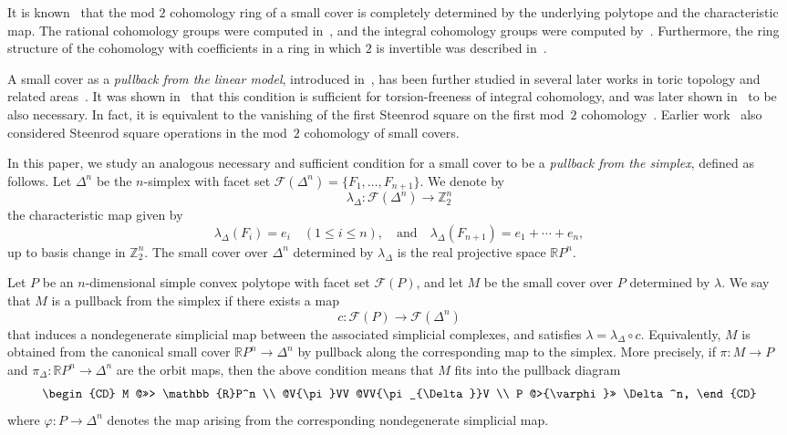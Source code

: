 \documentclass{amsart}
\newcommand{\cF}{\mathcal{F}}
\newcommand{\RP}{\mathbb{R}P}
\newcommand{\Z}{\mathbb{Z}}
\theoremstyle{plain}
\numberwithin{equation}{section}
\theoremstyle{definition}
\theoremstyle{remark}
\begin{document}
It is known~\cite{Davis-Januszkiewicz1991} that the mod $2$ cohomology ring of a small cover is completely determined by the underlying polytope and the characteristic map.
The rational cohomology groups were computed in~\cite{Suciu-Trevisan2012,Choi-Park2017Cohomology}, and the integral cohomology groups were computed by~\cite{Cai-Choi2021}.
Furthermore, the ring structure of the cohomology with coefficients in a ring in which $2$ is invertible was described in~\cite{Choi-Park2020}.

A small cover as a \emph{pullback from the linear model}, introduced in~\cite{Davis-Januszkiewicz1991}, has been further studied in several later works in toric topology and related areas~\cite{Izmestiev2001,Joswig2002,Nakayama-Nishimura2005, Cai-Choi-Park2020}.
It was shown in~\cite{Davis-Januszkiewicz1991} that this condition is sufficient for torsion-freeness of integral cohomology, and was later shown in~\cite{Cai-Choi-Park2020} to be also necessary. 
In fact, it is equivalent to the vanishing of the first Steenrod square on the first mod~$2$ cohomology~\cite{Cai-Choi-Park2020}.
Earlier work~\cite{Bahri-Bendersky2000} also considered Steenrod square operations in the mod~$2$ cohomology of small covers.




In this paper, we study an analogous necessary and sufficient condition for a small cover to be a \emph{pullback from the simplex}, defined as follows.
Let $\Delta^n$ be the $n$-simplex with facet set $\cF(\Delta^n)=\{F_1,\dots,F_{n+1}\}$.
We denote by
\[
\lambda_{\Delta}\colon \cF(\Delta^n)\to \Z_2^n
\]
the characteristic map given by
$$
    \lambda_{\Delta}(F_i)=e_i \quad (1\le i\le n), \quad \text{and} \quad \lambda_{\Delta}(F_{n+1})=e_1+\cdots+e_n,
$$
up to basis change in $\Z_2^n$.
The small cover over $\Delta^n$ determined by $\lambda_{\Delta}$ is the real projective space $\RP^n$.

Let $P$ be an $n$-dimensional simple convex polytope with facet set $\cF(P)$, and let $M$ be the small cover over $P$ determined by $\lambda$.
We say that $M$ is a pullback from the simplex if there exists a map
\[
    c\colon \cF(P)\longrightarrow \cF(\Delta^n)
\]
that induces a nondegenerate simplicial map between the associated simplicial complexes, and satisfies $\lambda=\lambda_{\Delta}\circ c$.
Equivalently, $M$ is obtained from the canonical small cover $\RP^n\to \Delta^n$ by pullback along the corresponding map to the simplex.
More precisely, if $\pi\colon M\to P$ and $\pi_{\Delta}\colon \RP^n\to \Delta^n$ are the orbit maps, then the above condition means that $M$ fits into the pullback diagram
\[
\begin{CD}
M @>>> \RP^n \\
@V{\pi}VV @VV{\pi_{\Delta}}V \\
P @>{\varphi}>> \Delta^n,
\end{CD}
\]
where $\varphi\colon P\to \Delta^n$ denotes the map arising from the corresponding nondegenerate simplicial map.
\end{document}
